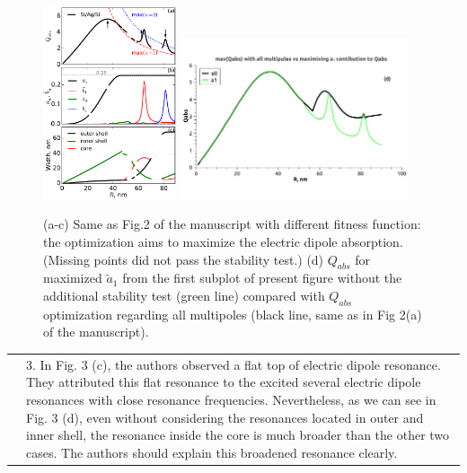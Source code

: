 \documentclass[a4paper]{article}
\begin{document}
\begin{figure}
  \includegraphics[width=0.35\textwidth]{overview-Qabs-a1}
   \includegraphics[width=0.60\textwidth]{overview-Qabs-all-a1}
  \caption{(a-c) Same as Fig.2 of the manuscript with different
    fitness function: the optimization aims to maximize the electric
    dipole absorption. (Missing points did not pass the stability
    test.) (d) $Q_{abs}$ for maximized $\tilde{a}_1$ from the first
    subplot of present figure without the additional stability test
    (green line) compared with $Q_{abs}$ optimization regarding all
    multipoles (black line, same as in Fig 2(a) of the
    manuscript).\label{fig:a1max}}
\end{figure}


\begin{tabular}[!H]{l|p{}}
\quad & 3.  In Fig. 3 (c), the authors observed a flat top of electric
dipole resonance. They attributed this flat resonance to the excited
several electric dipole resonances with close resonance
frequencies. Nevertheless, as we can see in Fig. 3 (d), even without
considering the resonances located in outer and inner shell, the
resonance inside the core is much broader than the other two
cases. The authors should explain this broadened resonance clearly.
\end{tabular}
\end{document}
